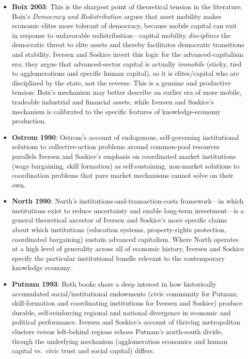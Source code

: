 \documentclass[12pt]{article}
\begin{document}
\begin{itemize}[leftmargin=*, itemsep=4pt]
    \item \textbf{Boix 2003}: This is the sharpest point of theoretical tension in the literature. Boix's \textit{Democracy and Redistribution} argues that asset mobility makes economic elites more tolerant of democracy, because mobile capital can exit in response to unfavorable redistribution---capital mobility \textit{disciplines} the democratic threat to elite assets and thereby facilitates democratic transitions and stability. Iversen and Soskice invert this logic for the advanced-capitalism era: they argue that advanced-sector capital is actually \textit{immobile} (sticky, tied to agglomerations and specific human capital), so it is elites/capital who are disciplined by the state, not the reverse. This is a genuine and productive tension: Boix's mechanism may better describe an earlier era of more mobile, tradeable industrial and financial assets, while Iversen and Soskice's mechanism is calibrated to the specific features of knowledge-economy production.
    \item \textbf{Ostrom 1990}: Ostrom's account of endogenous, self-governing institutional solutions to collective-action problems around common-pool resources parallels Iversen and Soskice's emphasis on coordinated market institutions (wage bargaining, skill formation) as self-sustaining, non-market solutions to coordination problems that pure market mechanisms cannot solve on their own.
    \item \textbf{North 1990}: North's institutions-and-transaction-costs framework---in which institutions exist to reduce uncertainty and enable long-term investment---is a general theoretical ancestor of Iversen and Soskice's more specific claims about which institutions (education systems, property-rights protection, coordinated bargaining) sustain advanced capitalism. Where North operates at a high level of generality across all of economic history, Iversen and Soskice specify the particular institutional bundle relevant to the contemporary knowledge economy.
    \item \textbf{Putnam 1993}: Both books share a deep interest in how historically accumulated social/institutional endowments (civic community for Putnam; skill-formation and coordinating institutions for Iversen and Soskice) produce durable, self-reinforcing regional and national divergence in economic and political performance. Iversen and Soskice's account of thriving metropolitan clusters versus left-behind regions echoes Putnam's north-south divide, though the underlying mechanism (agglomeration economics and human capital vs.\ civic trust and social capital) differs.

\end{itemize}
\end{document}
